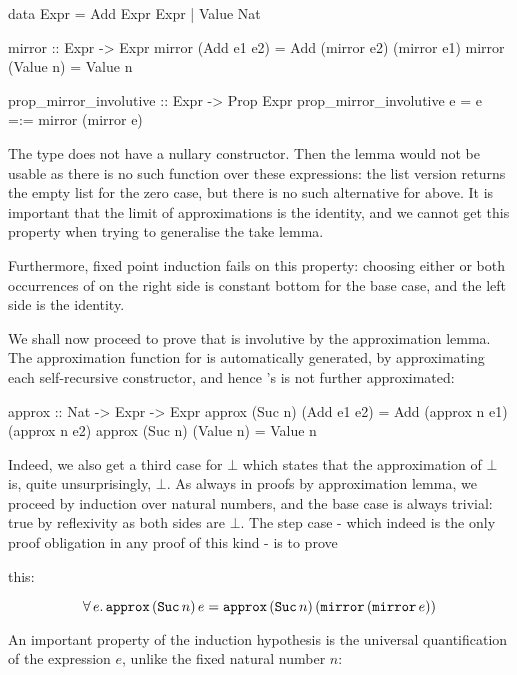 \begin{code}
data Expr = Add Expr Expr | Value Nat

mirror :: Expr -> Expr
mirror (Add e1 e2) = Add (mirror e2) (mirror e1)
mirror (Value n)   = Value n

prop_mirror_involutive :: Expr -> Prop Expr
prop_mirror_involutive e = e =:= mirror (mirror e)
\end{code}

The type  does not have a nullary constructor. Then the
 lemma would not be usable as there is no such function over
these expressions: the list version returns the empty list \hs{[]} for
the zero case, but there is no such alternative for 
above. It is important that the limit of approximations is the
identity, and we cannot get this property when trying to generalise
the take lemma.

Furthermore, fixed point induction fails on this property: choosing
either or both occurrences of  on the right side is
constant bottom for the base case, and the left side is the identity.

We shall now proceed to prove that  is involutive by the
approximation lemma. The approximation function for  is
automatically generated, by approximating each self-recursive
constructor, and hence 's  is not further approximated:

\begin{code}
approx :: Nat -> Expr -> Expr
approx (Suc n) (Add e1 e2) = Add (approx n e1) (approx n e2)
approx (Suc n) (Value n)   = Value n
\end{code}

Indeed, we also get a third case for $\bot$ which states that the
approximation of $\bot$ is, quite unsurprisingly, $\bot$.
As always in proofs by approximation lemma, we proceed by induction
over natural numbers, and the base case is always trivial: true by
reflexivity as both sides are $\bot$. The step case - which indeed is
the only proof obligation in any proof of this kind - is to prove

this:

\begin{equation*}
\fa{e}  \hs{approx} \, (\hs{Suc} \, n) \, e = \hs{approx} \, (\hs{Suc} \, n) \, (\hs{mirror} \, (\hs{mirror} \, e))
\end{equation*}

An important property of the induction hypothesis is the universal
quantification of the expression $e$, unlike the fixed natural number
$n$:

